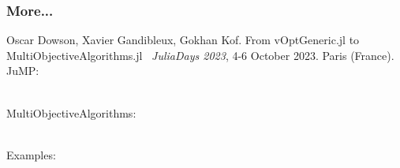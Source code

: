 \documentclass[]{beamer}
\newcommand*{\blue}[1]{\textcolor{nblue}{#1}}
\begin{document}
\begin{frame}
  \frametitle{More...}
\vspace{3mm}

{\footnotesize

Oscar Dowson, Xavier Gandibleux, Gokhan Kof. 
From vOptGeneric.jl to MultiObjectiveAlgorithms.jl \ \textit{JuliaDays 2023}, 4-6 October 2023. Paris (France).\vspace{10mm}\\


    \hspace{0mm}\blue{JuMP}:\\
    \\
\vspace{5mm}
  
    \hspace{0mm}\blue{MultiObjectiveAlgorithms}:\\
    \\
\vspace{5mm}
  
    \hspace{0mm}\blue{Examples:}\\
    \\
\vspace{10mm}

}
\end{frame}

% 
%
\end{document}
